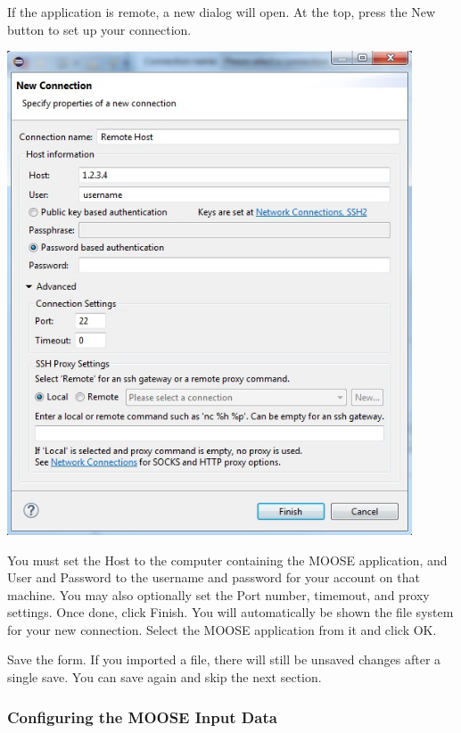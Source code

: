 \documentclass{article}
\begin{document}
If the application is remote, a new dialog will open. At the top, press the New
button to set up your connection. 

\begin{center}
\includegraphics[width=12cm]{images/NewConnectionDialog}
\end{center}

You must set the Host to the computer containing the MOOSE application, and User
and Password to the username and password for your account on that machine. You
may also optionally set the Port number, timemout, and proxy settings. Once
done, click Finish. You will automatically be shown the file system for your new
connection. Select the MOOSE application from it and click OK.

Save the form. If you imported a file, there will still be unsaved changes after
a single save. You can save again and skip the next section. 

\subsubsection{Configuring the MOOSE Input Data}
\end{document}
